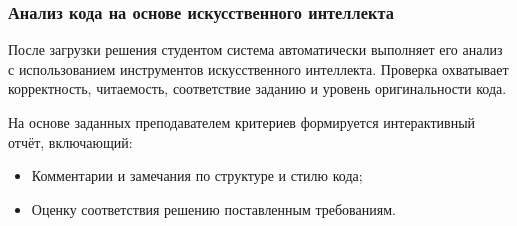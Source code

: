 \subsubsection{Анализ кода на основе искусственного интеллекта}
После загрузки решения студентом система автоматически выполняет его анализ с использованием инструментов искусственного интеллекта. Проверка охватывает корректность, читаемость, соответствие заданию и уровень оригинальности кода.

На основе заданных преподавателем критериев формируется интерактивный отчёт, включающий:
\begin{itemize}
  \item Комментарии и замечания по структуре и стилю кода;
  \item Оценку соответствия решению поставленным требованиям.
\end{itemize}
